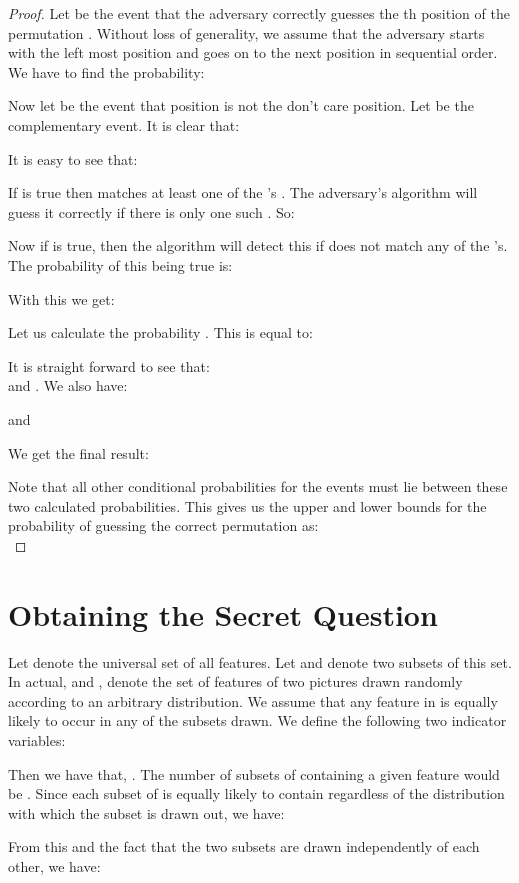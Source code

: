 \documentclass{llncs}
\begin{document}
\begin{proof}
Let  be the event that the adversary correctly guesses the th position of the permutation . Without loss of generality, we assume that the adversary starts with the left most position and goes on to the next position in sequential order. We have to find the probability:

Now let  be the event that position  is not the don't care position. Let  be the complementary event. It is clear that:

It is easy to see that: 

If  is true then  matches at least one of the 's . The adversary's algorithm will guess it correctly if there is only one such . So:


Now if  is true, then the algorithm will detect this if  does not match any of the 's. The probability of this being true is:

With this we get:


Let us calculate the probability . This is equal to:


It is straight forward to see that:\\
 and . We also have:

and

We get the final result:

Note that all other conditional probabilities for the events  must lie between these two calculated probabilities. This gives us the upper and lower bounds for the probability of guessing the correct permutation as:
\\
 
\end{proof}
\section{Obtaining the Secret Question}
Let  denote the universal set of all features. Let  and  denote two subsets of this set. In actual,  and , denote the set of features of two pictures drawn randomly according to an arbitrary distribution. We assume that any feature  in  is equally likely to occur in any of the subsets drawn. We define the following two indicator variables:

Then we have that, . The number of subsets of  containing a given feature  would be . Since each subset of  is equally likely to contain  regardless of the distribution with which the subset is drawn out, we have:

From this and the fact that the two subsets are drawn independently of each other, we have:
\end{document}
